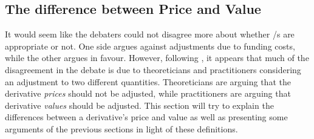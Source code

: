 \documentclass[main.tex]{subfiles}
\begin{document}
    \subsection{The difference between Price and Value}

    It would seem like the debaters could not disagree more 
    about whether \FVA/s are appropriate or not.
    One side argues against adjustments due to funding costs, while the other argues in favour.
    However, following \cite{Ruiz2015XVA}, 
    it appears that much of the disagreement in the debate is due to theoreticians and practitioners
    considering an adjustment to two different quantities.
    Theoreticians are arguing that the derivative \textit{prices} should not be adjusted,
    while practitioners are arguing that derivative \textit{values} should be adjusted.
    This section will try to explain the differences between a derivative's price and value
    as well as presenting some arguments of the previous sections in light of these definitions.
\end{document}

